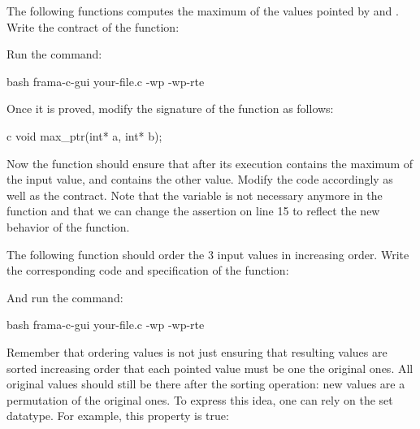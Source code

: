 


The following functions computes the maximum of the values pointed by
 and . Write the contract of the function:






Run the command:



\begin{CodeBlock}{bash}
frama-c-gui your-file.c -wp -wp-rte
\end{CodeBlock}



Once it is proved, modify the signature of the function as follows:



\begin{CodeBlock}{c}
void max_ptr(int* a, int* b);
\end{CodeBlock}


Now the function should ensure that after its execution 
contains the maximum of the input value, and  contains the
other value. Modify the code accordingly as well as the contract. Note that
the variable  is not necessary anymore in the 
function and that we can change the assertion on line 15 to reflect the
new behavior of the function.






The following function should order the 3 input values in increasing order.
Write the corresponding code and specification of the function:




And run the command:


\begin{CodeBlock}{bash}
frama-c-gui your-file.c -wp -wp-rte
\end{CodeBlock}


Remember that ordering values is not just ensuring that resulting values
are sorted increasing order that each pointed value must be one the original
ones. All original values should still be there after the sorting operation:
new values are a permutation of the original ones. To express this idea, one
can rely on the set datatype. For example, this property is true:


